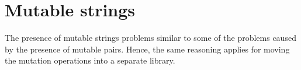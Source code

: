 \documentclass[twoside,twocolumn]{algol60}
\begin{document}
\chapter{Mutable strings}

The presence of mutable strings problems similar to some of the
problems caused by the presence of mutable pairs.  Hence, the same
reasoning applies for moving the mutation operations into a separate
library.



\renewcommand{\bibname}{References}




\vfill\eject


\newcommand{\indexheading}{Alphabetic index of definitions of
  concepts, keywords, and procedures}
\newcommand{\indexintro}{}

\printindex
 
\end{document}

